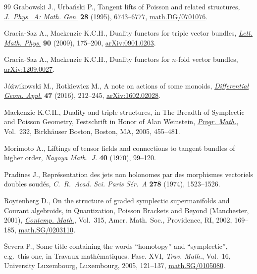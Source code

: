 \documentclass[11pt]{article}
\numberwithin{equation}{section}
\begin{document}
\begin{thebibliography}{99}
Grabowski J., Urba{\'n}ski P., Tangent lifts of {P}oisson and related
  structures, \href{http://dx.doi.org/10.1088/0305-4470/28/23/024}{\textit{J.~Phys.~A: Math. Gen.}} \textbf{28} (1995), 6743--6777,
  \href{http://arxiv.org/abs/math.DG/0701076}{math.DG/0701076}.

Gracia-Saz A., Mackenzie K.C.H., Duality functors for triple vector bundles,
  \href{http://dx.doi.org/10.1007/s11005-009-0346-z}{\textit{Lett. Math. Phys.}} \textbf{90} (2009), 175--200, \href{http://arxiv.org/abs/0901.0203}{arXiv:0901.0203}.

Gracia-Saz A., Mackenzie K.C.H., Duality functors for $n$-fold vector bundles,
  \href{http://arxiv.org/abs/1209.0027}{arXiv:1209.0027}.

J{\'o}{\'z}wikowski M., Rotkiewicz M., A note on actions of some monoids,
  \href{http://dx.doi.org/10.1016/j.difgeo.2016.04.003}{\textit{Differential Geom. Appl.}} \textbf{47} (2016), 212--245,
  \href{http://arxiv.org/abs/1602.02028}{arXiv:1602.02028}.

Mackenzie K.C.H., Duality and triple structures, in The Breadth of Symplectic
  and {P}oisson Geometry, Festschrift in Honor of Alan Weinstein,
  \href{http://dx.doi.org/10.1007/0-8176-4419-9_15}{\textit{Progr. Math.}}, Vol.~232, Birkh\"auser Boston, Boston, MA, 2005,
  455--481.

Morimoto A., Liftings of tensor f\/ields and connections to tangent bundles of
  higher order, \textit{Nagoya Math.~J.} \textbf{40} (1970), 99--120.

Pradines J., Repr\'esentation des jets non holonomes par des morphismes
  vectoriels doubles soud\'es, \textit{C.~R.~Acad. Sci. Paris S\'er.~A}
  \textbf{278} (1974), 1523--1526.

Roytenberg D., On the structure of graded symplectic supermanifolds and
  {C}ourant algebroids, in Quantization, {P}oisson Brackets and Beyond
  ({M}anchester, 2001), \href{http://dx.doi.org/10.1090/conm/315/05479}{\textit{Contemp. Math.}}, Vol.~315, Amer. Math. Soc.,
  Providence, RI, 2002, 169--185, \href{http://arxiv.org/abs/math.SG/0203110}{math.SG/0203110}.

{\v{S}}evera P., Some title containing the words ``homotopy'' and
  ``symplectic'', e.g.\ this one, in Travaux math\'ematiques. {F}asc. {XVI},
  \textit{Trav. Math.}, Vol.~16, University Luxembourg, Luxembourg, 2005,
  121--137, \href{http://arxiv.org/abs/math.SG/0105080}{math.SG/0105080}.


\end{thebibliography}
\end{document}
